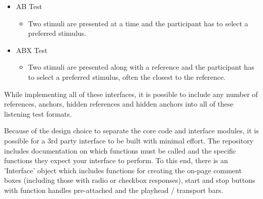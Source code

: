 \documentclass{sig-alternate}
\begin{document}
\begin{itemize}[noitemsep,nolistsep]
\begin{itemize}
		\end{itemize}
		\item AB Test~\cite{lipshitz1981great}
		\begin{itemize}
			\item Two stimuli are presented at a time and the participant has to select a preferred stimulus.
		\end{itemize}
		\item ABX Test~\cite{clark1982high}
		\begin{itemize}
			\item Two stimuli are presented along with a reference and the participant has to select a preferred stimulus, often the closest to the reference.
		\end{itemize}
	\end{itemize}
	
	While implementing all of these interfaces, it is possible to include any number of references, anchors, hidden references and hidden anchors into all of these listening test formats.
	
	Because of the design choice to separate the core code and interface modules, it is possible for a 3rd party interface to be built with minimal effort. The repository includes documentation on which functions must be called and the specific functions they expect your interface to perform. To this end, there is an 'Interface' object which includes functions for creating the on-page comment boxes (including those with radio or checkbox responses), start and stop buttons with function handles pre-attached and the playhead / transport bars.
	
\end{document}
